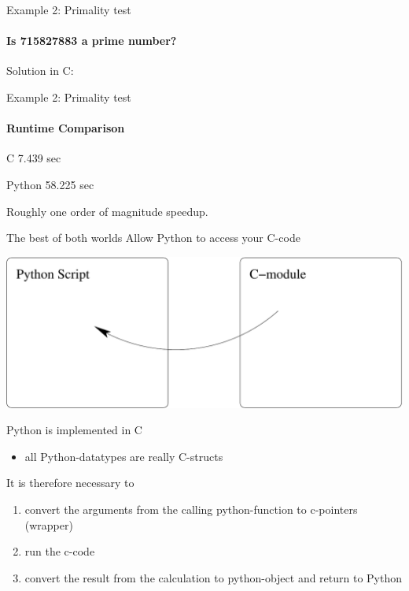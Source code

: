 \documentclass[german]{beamer}
\newcommand{\ra}{\text{$\rightarrow$}}
\begin{document}

\begin{frame}[fragile]{Example 2: Primality test}
  \framesubtitle{Is 715827883 a prime number?}

  Solution in C:
  

\end{frame}
\begin{frame}[fragile]{Example 2: Primality test}
  \framesubtitle{Runtime Comparison}

\begin{minipage}{.45\textwidth}
\begin{block}{C}
7.439 sec
\end{block}
\end{minipage}
\hfill
\begin{minipage}{.45\textwidth}
\begin{block}{Python}
58.225 sec
\end{block}
\end{minipage}

Roughly one order of magnitude speedup.
\end{frame}



\begin{frame}[fragile]{The best of both worlds}
Allow Python to access your C-code

\includegraphics[width=.5\textwidth]{pics/cmod}

Python is implemented in C
\begin{itemize}
\item[\ra] all Python-datatypes are really C-structs
\end{itemize}

It is therefore necessary to
\begin{enumerate}
\item convert the arguments from the calling python-function to
  c-pointers (wrapper)
\item run the c-code
\item convert the result from the calculation to python-object and
  return to Python
\end{enumerate}

\end{frame}
\end{document}
